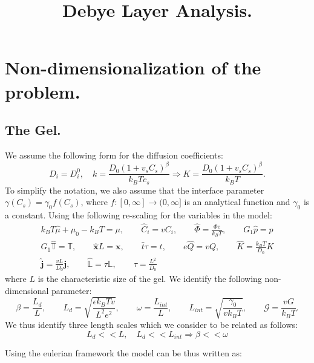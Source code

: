 \documentclass[12pt]{extarticle}
\title{Debye Layer Analysis.}
\author{}
\newcommand{\LL}{\ensuremath{\mathbb{L}}}
\begin{document}
\section{Non-dimensionalization of the problem.}
\subsection{The Gel.}
We assume the following form for the diffusion coefficients:
\begin{equation}
D_i=D_i^0,\quad k = \frac{D_0(1+v_sC_s)^\beta}{k_B T c_s} \Rightarrow K=  \frac{D_0(1+v_sC_s)^\beta}{k_B T}.
\end{equation}
To simplify the notation, we also assume that the interface parameter $\gamma(C_s)=\gamma_0 f(C_s)$, where $f:[0,\infty]\rightarrow(0,\infty]$ is an analytical function and $\gamma_0$ is a constant. 
Using the following re-scaling for the variables in the model:
\begin{equation*}
\begin{aligned}
k_BT\hat{\mu} + \mu_0 -k_BT= \mu, \qquad \hat{C}_i = vC_i, \qquad \hat{\Phi} = \frac{\Phi e}{k_B T}, \qquad  G_1\hat{p}= p\\
G_1\hat{\mathbb{T}}=\mathbb{T}, \qquad\hat{\mathbf{x}} L =\mathbf{x}, \qquad \hat{t}\tau=t, \qquad e\hat{Q} =v Q, \qquad \hat{K} = \frac{k_BT}{D_0}K\\
\hat{\mathbf{j}}=\frac{vL}{D_0}\mathbf{j}, \qquad \hat{\LL}= \tau \LL, \qquad \tau=\frac{L^2}{D_0}
\end{aligned}
\end{equation*}
where $L$ is the characteristic size of the gel. We identify the following non-dimensional parameter:
\begin{equation*}
\beta=\frac{L_d}{L}, \qquad L_d= \sqrt{\frac{\epsilon k_B Tv}{L^2e^2}}, \qquad \omega= \frac{L_{int}}{L}, \qquad L_{int}=\sqrt{\frac{\gamma_0}{vk_BT}}, \qquad \mathcal{G}=\frac{vG}{k_BT}.
\end{equation*}
We thus identify three length scales which we consider to be related as follows:
\begin{equation}
L_d<<L, \quad L_d<<L_{int} \Rightarrow \beta<<\omega
\end{equation}

Using the eulerian framework the model can be thus written as:
\end{document}
